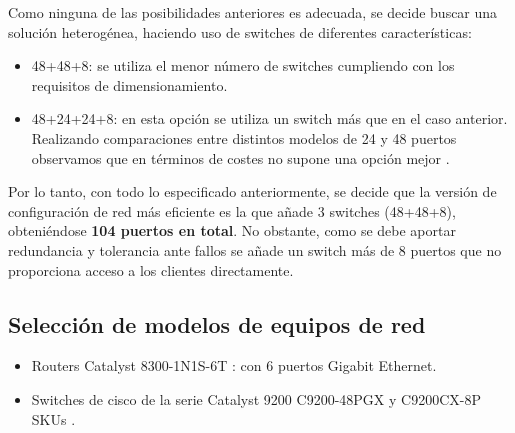 \vspace{1mm}

Como ninguna de las posibilidades anteriores es adecuada, se decide buscar una solución heterogénea, haciendo uso de switches de diferentes características: 

\begin{itemize}
\item 48+48+8: se utiliza el menor número de switches cumpliendo con los requisitos de dimensionamiento. \vspace{2mm} \pagebreak
\item 48+24+24+8: en esta opción se utiliza un switch más que en el caso anterior. Realizando comparaciones entre distintos modelos de 24 y 48 puertos observamos que en términos de costes no supone una opción mejor \cite{cisco_switches}\cite{tplink_switches}\cite{huawei_switches}.\vspace{2mm}
\end{itemize}

Por lo tanto, con todo lo especificado anteriormente, se decide que la versión de configuración de red más eficiente es la que añade 3 switches (48+48+8), obteniéndose \textbf{104 puertos en total}. No obstante, como se debe aportar redundancia y tolerancia ante fallos se añade un switch más de 8 puertos que no proporciona acceso a los clientes directamente.

\vspace{1mm}

\subsection{Selección de modelos de equipos de red}

\vspace{1mm}

\begin{itemize}
\item Routers Catalyst 8300-1N1S-6T \cite{cat8300}: con 6 puertos Gigabit Ethernet. \vspace{1mm}
\item Switches de cisco de la serie Catalyst 9200 C9200-48PGX y C9200CX-8P SKUs \cite{cat9200}.
\end{itemize}

\vspace{2mm}

